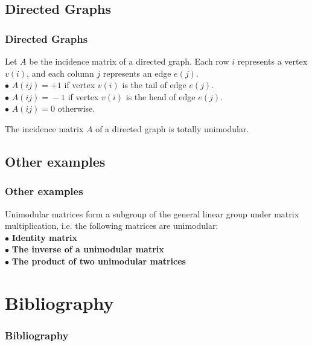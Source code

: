 \documentclass{beamer}
\begin{document}
\subsection{Directed Graphs}
\begin{frame}\frametitle{Directed Graphs}
\begin{block}{}
Let $A$ be the incidence matrix of a directed graph. Each row $i$ represents a vertex $v(i)$, and each column $j$ represents an edge $e(j)$. \\
$\bullet$ $A(ij) = +1$ if vertex $v(i)$ is the tail of edge $e(j)$. \\
$\bullet$ $A(ij) = ­-1$ if vertex $v(i)$ is the head of edge $e(j)$. \\
$\bullet$ $A(ij) = 0$ otherwise.
\end{block}
\begin{block}{}
The incidence matrix $A$ of a directed graph is totally unimodular.
\end{block}
\end{frame}

\subsection{Other examples}
\begin{frame}\frametitle{Other examples}
\begin{block}{}
Unimodular matrices form a subgroup of the general linear group under matrix multiplication, i.e. the following matrices are unimodular: \\
$\bullet$ \textbf{Identity matrix} \\
$\bullet$ \textbf{The inverse of a unimodular matrix} \\
$\bullet$ \textbf{The product of two unimodular matrices} \\
\end{block}
\end{frame}

\section{Bibliography}
\begin{frame}[allowframebreaks]
\frametitle{Bibliography}
    \tiny{ }
    
\end{frame}
\end{document}
